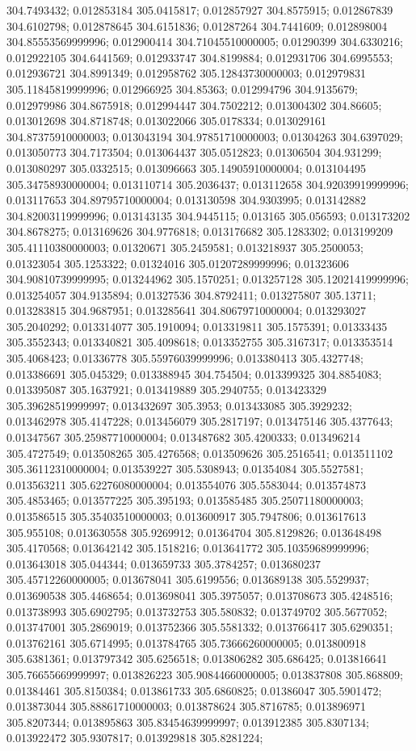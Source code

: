 304.7493432; 0.012853184 305.0415817; 0.012857927 304.8575915; 0.012867839 304.6102798; 0.012878645 304.6151836; 0.01287264 304.7441609; 0.012898004 304.85553569999996; 0.012900414 304.71045510000005; 0.01290399 304.6330216; 0.012922105 304.6441569; 0.012933747 304.8199884; 0.012931706 304.6995553; 0.012936721 304.8991349; 0.012958762 305.12843730000003; 0.012979831 305.11845819999996; 0.012966925 304.85363; 0.012994796 304.9135679; 0.012979986 304.8675918; 0.012994447 304.7502212; 0.013004302 304.86605; 0.013012698 304.8718748; 0.013022066 305.0178334; 0.013029161 304.87375910000003; 0.013043194 304.97851710000003; 0.01304263 304.6397029; 0.013050773 304.7173504; 0.013064437 305.0512823; 0.01306504 304.931299; 0.013080297 305.0332515; 0.013096663 305.14905910000004; 0.013104495 305.34758930000004; 0.013110714 305.2036437; 0.013112658 304.92039919999996; 0.013117653 304.89795710000004; 0.013130598 304.9303995; 0.013142882 304.82003119999996; 0.013143135 304.9445115; 0.013165 305.056593; 0.013173202 304.8678275; 0.013169626 304.9776818; 0.013176682 305.1283302; 0.013199209 305.41110380000003; 0.01320671 305.2459581; 0.013218937 305.2500053; 0.01323054 305.1253322; 0.01324016 305.01207289999996; 0.01323606 304.90810739999995; 0.013244962 305.1570251; 0.013257128 305.12021419999996; 0.013254057 304.9135894; 0.01327536 304.8792411; 0.013275807 305.13711; 0.013283815 304.9687951; 0.013285641 304.80679710000004; 0.013293027 305.2040292; 0.013314077 305.1910094; 0.013319811 305.1575391; 0.01333435 305.3552343; 0.013340821 305.4098618; 0.013352755 305.3167317; 0.013353514 305.4068423; 0.01336778 305.55976039999996; 0.013380413 305.4327748; 0.013386691 305.045329; 0.013388945 304.754504; 0.013399325 304.8854083; 0.013395087 305.1637921; 0.013419889 305.2940755; 0.013423329 305.39628519999997; 0.013432697 305.3953; 0.013433085 305.3929232; 0.013462978 305.4147228; 0.013456079 305.2817197; 0.013475146 305.4377643; 0.01347567 305.25987710000004; 0.013487682 305.4200333; 0.013496214 305.4727549; 0.013508265 305.4276568; 0.013509626 305.2516541; 0.013511102 305.36112310000004; 0.013539227 305.5308943; 0.01354084 305.5527581; 0.013563211 305.62276080000004; 0.013554076 305.5583044; 0.013574873 305.4853465; 0.013577225 305.395193; 0.013585485 305.25071180000003; 0.013586515 305.35403510000003; 0.013600917 305.7947806; 0.013617613 305.955108; 0.013630558 305.9269912; 0.01364704 305.8129826; 0.013648498 305.4170568; 0.013642142 305.1518216; 0.013641772 305.10359689999996; 0.013643018 305.044344; 0.013659733 305.3784257; 0.013680237 305.45712260000005; 0.013678041 305.6199556; 0.013689138 305.5529937; 0.013690538 305.4468654; 0.013698041 305.3975057; 0.013708673 305.4248516; 0.013738993 305.6902795; 0.013732753 305.580832; 0.013749702 305.5677052; 0.013747001 305.2869019; 0.013752366 305.5581332; 0.013766417 305.6290351; 0.013762161 305.6714995; 0.013784765 305.73666260000005; 0.013800918 305.6381361; 0.013797342 305.6256518; 0.013806282 305.686425; 0.013816641 305.76655669999997; 0.013826223 305.90844660000005; 0.013837808 305.868809; 0.01384461 305.8150384; 0.013861733 305.6860825; 0.01386047 305.5901472; 0.013873044 305.88861710000003; 0.013878624 305.8716785; 0.013896971 305.8207344; 0.013895863 305.83454639999997; 0.013912385 305.8307134; 0.013922472 305.9307817; 0.013929818 305.8281224; 